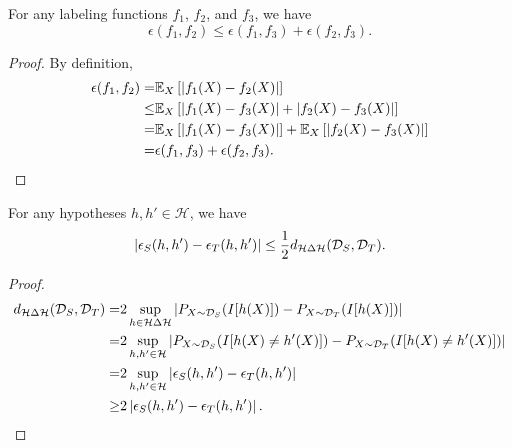 \begin{lemma}\label{lem:triangle}
  For any labeling functions $f_1$, $f_2$, and $f_3$, we have
  \begin{equation}\label{eq:triangle}
    \epsilon(f_1,f_2) \leq \epsilon(f_1,f_3) + \epsilon(f_2,f_3).
  \end{equation}
\end{lemma}
\begin{proof}
  By definition,
  \begin{align}
    \epsilon(f_1, f_2)
    =   & \mathbb{E}_{X}\left[\left \lvert f_1(X)-f_2(X) \right \rvert\right] \label{eq:triangle_1}\\
    \leq& \mathbb{E}_{X}\left[\left \lvert f_1(X)-f_3(X) \right \rvert + \left \lvert f_2(X)-f_3(X) \right \rvert \right] \label{eq:triangle_2}\\
    =   & \mathbb{E}_{X}\left[\left \lvert f_1(X)-f_3(X) \right \rvert\right] + \mathbb{E}_{X}\left[\left \lvert f_2(X)-f_3(X) \right \rvert\right] \label{eq:triangle_3}\\
    =   & \epsilon(f_1, f_3) + \epsilon(f_2, f_3). \label{eq:triangle_4}
  \end{align}
\end{proof}

\begin{lemma}\label{lem:h_bound}
  For any hypotheses $h, h' \in \mathcal{H}$, we have
  \begin{equation}\label{eq:h_bound}
    \vert \epsilon_{S}(h,h') - \epsilon_{T}(h,h') \vert
    \leq
    \frac{1}{2} d_{\mathcal{H} \Delta \mathcal{H}}(\mathcal{D}_S,\mathcal{D}_T).
  \end{equation}
\end{lemma}
\begin{proof}
  \begin{align}
    d_{\mathcal{H} \Delta \mathcal{H}}(\mathcal{D}_S, \mathcal{D}_T)
    =& 2 \sup_{h \in \mathcal{H} \Delta \mathcal{H}} \left \lvert P_{X \sim \mathcal{D}_S}(I[h(X)]) - P_{X \sim \mathcal{D}_T}(I[h(X)]) \right \rvert \label{eq:h_bound_1}\\
    =& 2 \sup_{h, h' \in \mathcal{H}} \left \lvert P_{X \sim \mathcal{D}_S}(I[h(X) \ne h'(X)]) - P_{X \sim \mathcal{D}_T}(I[h(X) \ne h'(X)]) \right \rvert \label{eq:h_bound_2}\\
    =& 2 \sup_{h, h' \in \mathcal{H}} \left \lvert \epsilon_{S}(h, h') - \epsilon_{T}(h, h') \right \rvert \label{eq:h_bound_3}\\
    \geq& 2 \left \lvert \epsilon_{S}(h, h') - \epsilon_{T}(h, h') \right \rvert. \label{eq:h_bound_4}
  \end{align}
\end{proof}


